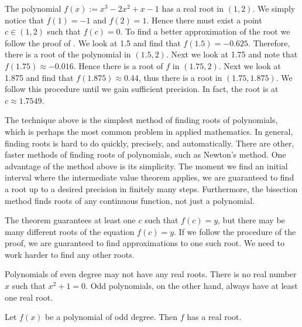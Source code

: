 \begin{example} %
The polynomial $f(x) := x^3-2x^2+x-1$ has a real root in $(1,2)$.  We simply
notice that $f(1) = -1$ and $f(2) = 1$.  Hence there must exist a point $c
\in (1,2)$ such that $f(c) = 0$.  To find a better approximation of
the root we follow the proof of .  
We look at 1.5 and find that $f(1.5) = -0.625$.  Therefore,
there is a root of the polynomial in $(1.5,2)$.  Next we look at 1.75
and note that $f(1.75) \approx -0.016$.  Hence there is a root of $f$ in
$(1.75,2)$.  Next we look at 1.875 and find that $f(1.875) \approx 0.44$,
thus there is a root in $(1.75,1.875)$.  We follow this procedure until we gain
sufficient precision.  In fact, the root is at $c \approx 1.7549$.
\end{example}

The technique above is the simplest method of finding roots of polynomials,
which is perhaps the most common problem in applied
mathematics.  In general, finding roots is hard to do quickly, precisely,
and automatically.
There are other, faster methods of finding roots of polynomials, such
as Newton's method.  One advantage of the method above is its
simplicity.  The
moment we find an initial interval where the intermediate value theorem
applies, we are guaranteed to find a root up to a desired
precision in finitely many steps.  Furthermore, the bisection
method finds
roots of any
continuous function, not just a polynomial.

The theorem guarantees at least one $c$ such that $f(c) = y$, but there
may be many different roots of the equation $f(c) = y$.  If we follow
the procedure of the proof, we are guaranteed to find approximations to
one such root.  We need to work harder to find any other roots.

\medskip

Polynomials of even degree may not have any real roots.
There is no real number $x$ such that $x^2+1 = 0$.  Odd polynomials, on the
other hand, always have at least one real root.

\begin{prop}
Let $f(x)$ be a polynomial of odd degree.  Then $f$ has a real root.
\end{prop}


